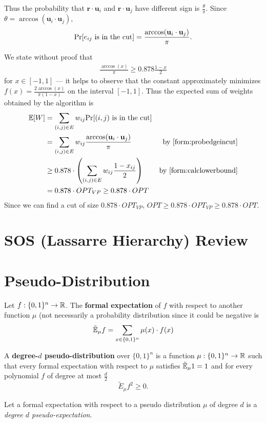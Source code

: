 \documentclass[
10pt, %
letterpaper, %
onecolumn, %
]{article}
\begin{document}
Thus the probability that $\mathbf{r} \cdot \mathbf{u}_i$ and $\mathbf{r} \cdot \mathbf{u}_j$ have different sign is $\frac{\theta}{\pi}$. Since $\theta = \arccos(\mathbf{u}_i\cdot\mathbf{u}_j)$,
\begin{align}
\label{form:probedgeincut}
\text{Pr}[e_{ij} \mbox{ is in the cut}] = \frac{\arccos(\mathbf{u}_i\cdot\mathbf{u}_j)}{\pi}.
\end{align}

We state without proof that
\begin{align}
\label{form:calclowerbound}
\frac{\arccos(x)}{\pi} \geq 0.878 \frac{1-x}{2}
\end{align}
for $x \in [-1,1]$ --- it helps to observe that the constant approximately minimizes $f(x) = \frac{2\arccos(x)}{\pi(1-x)}$ on the interval $[-1,1]$. Thus the expected sum of weights obtained by the algorithm is 
\begin{align*}
\mathbb{E}[W] &= \sum_{(i,j)\in E}w_{ij}\text{Pr}[(i,j)\mbox{ is in the cut}]\\
&= \sum_{(i,j)\in E}w_{ij}\frac{\arccos(\mathbf{u}_i\cdot\mathbf{u}_j)}{\pi} &\mbox{by } \ref{form:probedgeincut}\\
&\geq 0.878 \cdot \left(\sum_{(i,j)\in E}w_{ij}\frac{1 - x_{ij}}{2}\right) &\mbox{by } \ref{form:calclowerbound}\\ 
&= 0.878 \cdot OPT_{VP} \geq 0.878 \cdot OPT
\end{align*}
Since we can find a cut of size $0.878\cdot OPT_{VP}$, $OPT \geq 0.878\cdot OPT_{VP} \geq 0.878\cdot OPT$. 

\section{SOS (Lassarre Hierarchy) Review}

\section{Pseudo-Distribution}
\begin{definition}
Let $f: \{0,1\}^n \rightarrow \mathbb{R}$. The \textbf{formal expectation} of $f$ with respect to another function $\mu$ (not necessarily a probability distribution since it could be negative is 
\[\tilde{\mathbb{E}}_{\mu}f = \sum_{x \in \{0,1\}^n}\mu(x)\cdot f(x)\]

A \textbf{degree-$d$ pseudo-distribution} over $\{0,1\}^n$ is a function $\mu: \{0,1\}^n \rightarrow \mathbb{R}$ such that every formal expectation with respect to $\mu$ satisfies $\tilde{\mathbb{E}}_{\mu} 1 = 1$ and for every polynomial $f$ of degree at most $\frac{d}{2}$
\[\tilde{E}_{\mu}f^2 \geq 0.\]

Let a formal expectation with respect to a pseudo distribution $\mu$ of degree $d$ is a \emph{degree $d$ pseudo-expectation}.
\end{definition}
\end{document}
